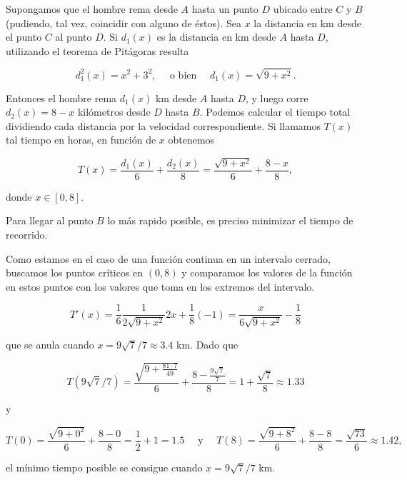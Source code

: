 \documentclass[
  letterpaper,
]{book}
\theoremstyle{plain}
\theoremstyle{remark}
\begin{document}
\begin{tcolorbox}[enhanced jigsaw, opacityback=0, left=2mm, opacitybacktitle=0.6, toprule=.15mm, bottomrule=.15mm, colbacktitle=quarto-callout-tip-color!10!white, titlerule=0mm, bottomtitle=1mm, title=\textcolor{quarto-callout-tip-color}{\faLightbulb}\hspace{0.5em}{Solución}, toptitle=1mm, colframe=quarto-callout-tip-color-frame, colback=white, breakable, rightrule=.15mm, arc=.35mm, leftrule=.75mm, coltitle=black]

Supongamos que el hombre rema desde \(A\) hasta un punto \(D\) ubicado
entre \(C\) y \(B\) (pudiendo, tal vez, coincidir con alguno de éstos).
Sea \(x\) la distancia en km desde el punto \(C\) al punto \(D\). Si
\(d_1(x)\) es la distancia en km desde \(A\) hasta \(D\), utilizando el
teorema de Pitágoras resulta

\[
d_1^2(x)=x^2+3^2, \quad \text{ o bien }\quad d_1(x)=\sqrt{9+x^2}.
\]

Entonces el hombre rema \(d_1(x)\) km desde \(A\) hasta \(D\), y luego
corre \(d_2(x)=8-x\) kilómetros desde \(D\) hasta \(B\). Podemos
calcular el tiempo total dividiendo cada distancia por la velocidad
correspondiente. Si llamamos \(T(x)\) tal tiempo en horas, en función de
\(x\) obtenemos

\[
T(x)=\frac{d_1(x)}{6}+\frac{d_2(x)}{8}=\frac{\sqrt{9+x^2}}{6}+\frac{8-x}{8},
\]

donde \(x\in [0,8]\).

Para llegar al punto \(B\) lo más rapido posible, es preciso minimizar
el tiempo de recorrido.

Como estamos en el caso de una función continua en un intervalo cerrado,
buscamos los puntos críticos en \((0,8)\) y comparamos los valores de la
función en estos puntos con los valores que toma en los extremos del
intervalo.

\[
T'(x)=\frac{1}{6}\frac{1}{2\sqrt{9+x^2}}2x+\frac{1}{8}(-1)=\frac{x}{6\sqrt{9+x^2}}-\frac{1}{8}
\]

que se anula cuando \(x=9\sqrt{7}/7\approx 3.4\) km. Dado que

\[
T(9\sqrt{7}/7)=\frac{\sqrt{9+\frac{81\cdot 7}{49}}}{6}+\frac{8-\frac{9\sqrt{7}}{7}}{8}=1+\frac{\sqrt{7}}{8}\approx 1.33
\]

y

\[
T(0)=\frac{\sqrt{9+0^2}}{6}+\frac{8-0}{8}=\frac{1}{2}+1=1.5 \quad \text{ y }\quad T(8)=\frac{\sqrt{9+8^2}}{6}+\frac{8-8}{8}=\frac{\sqrt{73}}{6}\approx 1.42, 
\]

el mínimo tiempo posible se consigue cuando \(x=9\sqrt{7}/7\) km.

\end{tcolorbox}
\end{document}
